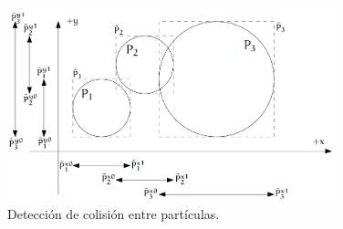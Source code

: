 \begin{figure}[h!]
\centering
\includegraphics[width=0.85\textwidth]{Images/Colision.PNG}
\caption{Detecci\'on de colisi\'on entre part\'iculas.}
\label{colision}
\end{figure}